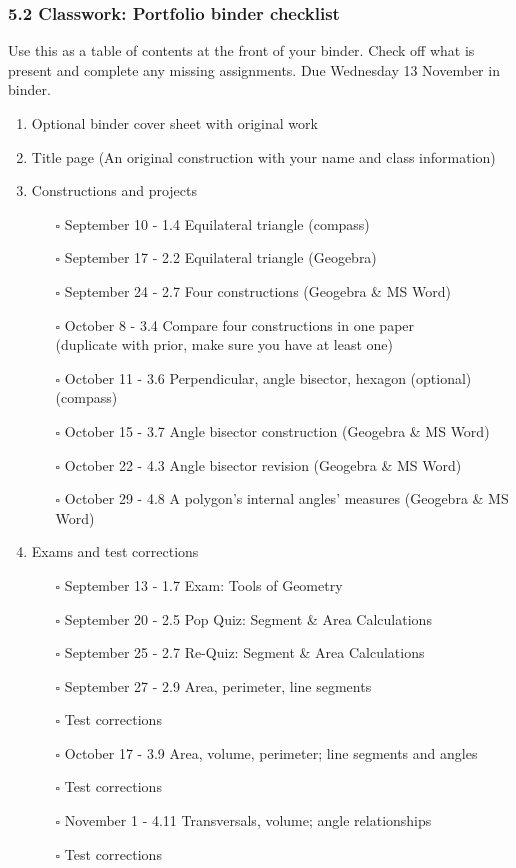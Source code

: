 \documentclass[12pt, twoside]{article}
\begin{document}
\subsubsection*{5.2 Classwork: Portfolio binder checklist}
Use this as a table of contents at the front of your binder. Check off what is present and complete any missing assignments. Due Wednesday 13 November in binder.
  \begin{enumerate}

  \item Optional binder cover sheet with original work
  \item Title page (An original construction with your name and class information)
  \item Constructions and projects
    \begin{itemize}
      \item[$\square$] September 10 - 1.4 Equilateral triangle (compass)
      \item[$\square$] September 17 - 2.2 Equilateral triangle (Geogebra)
      \item[$\square$] September 24 - 2.7 Four constructions (Geogebra \& MS Word)
      \item[$\square$] October 8 - 3.4 Compare four constructions in one paper \\(duplicate with prior, make sure you have at least one)
      \item[$\square$] October 11 - 3.6 Perpendicular, angle bisector, hexagon (optional)(compass)
      \item[$\square$] October 15 - 3.7 Angle bisector construction (Geogebra \& MS Word)
      \item[$\square$] October 22 - 4.3 Angle bisector revision (Geogebra \& MS Word)
      \item[$\square$] October 29 - 4.8 A polygon’s internal angles' measures (Geogebra \& MS Word)
    \end{itemize}
  
  \item Exams and test corrections
    \begin{itemize}
      \item[$\square$] September 13 - 1.7 Exam: Tools of Geometry
      \item[$\square$] September 20 - 2.5 Pop Quiz: Segment \& Area Calculations
      \item[$\square$] September 25 - 2.7 Re-Quiz: Segment \& Area Calculations
      \item[$\square$] September 27 - 2.9 Area, perimeter, line segments
          \item[$\square$] Test corrections
      \item[$\square$] October 17 - 3.9 Area, volume, perimeter; line segments and angles
        \item[$\square$] Test corrections
     \item[$\square$] November 1 - 4.11 Transversals, volume; angle relationships
      \item[$\square$] Test corrections
  \end{itemize}

\end{enumerate}
\end{document}
